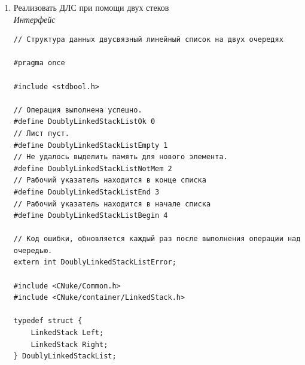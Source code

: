 \documentclass[a4paper,14pt]{extarticle}
\begin{document}
\begin{enumerate}
\begin{verbatim}
int FileError = FileOk;

File FileInit() {
    FileError = FileOk;
    return (File) {ArrayQueueInit(), ArrayQueueInit()};
}

BaseType FileRead(File *F) {
    FileError = FileOk;
    BaseType element = ArrayQueueGet(&F->Buf);

    if (ArrayQueueError != ArrayQueueOk) {
        FileError = FileEnd;
        return element;
    }

    ArrayQueuePut(&F->Read, element);
    if (ArrayQueueError != ArrayQueueOk) {
        FileError = FileNotMem;
        return element;
    }

    return element;
}

void FilePut(File* F, BaseType E) {
    FileError = FileOk;
    ArrayQueuePut(&F->Buf, E);
    if (ArrayQueueError != ArrayQueueOk) {
        FileError = FileNotMem;
    }
}

void FileBeginPtr(File* F) {
    FileError = FileOk;
    while (!ArrayQueueIsEmpty(F->Buf)) {
        ArrayQueuePut(&F->Read, ArrayQueueGet(&F->Buf));

        if (ArrayQueueError != ArrayQueueOk) {
            FileError = FileNotMem;
            return;
        }
    }

    ArrayQueue T = F->Buf;
    F->Buf = F->Read;
    F->Read = T;
}
    \end{verbatim}
    \item Реализовать ДЛС при помощи двух стеков\\
	\textit{Интерфейс}
    \begin{verbatim}
// Структура данных двусвязный линейный список на двух очередях

#pragma once

#include <stdbool.h>

// Операция выполнена успешно.
#define DoublyLinkedStackListOk 0
// Лист пуст.
#define DoublyLinkedStackListEmpty 1
// Не удалось выделить память для нового элемента.
#define DoublyLinkedStackListNotMem 2
// Рабочий указатель находится в конце списка
#define DoublyLinkedStackListEnd 3
// Рабочий указатель находится в начале списка
#define DoublyLinkedStackListBegin 4

// Код ошибки, обновляется каждый раз после выполнения операции над очередью.
extern int DoublyLinkedStackListError;

#include <CNuke/Common.h>
#include <CNuke/container/LinkedStack.h>

typedef struct {
    LinkedStack Left;
    LinkedStack Right;
} DoublyLinkedStackList;


\end{verbatim}
\end{enumerate}
\end{document}
